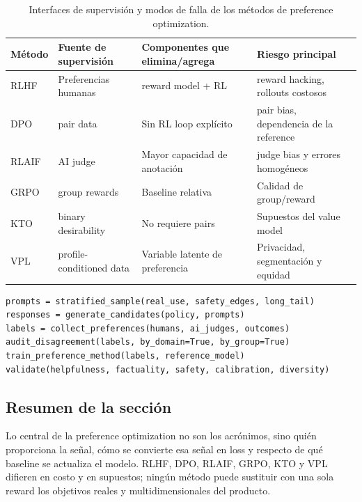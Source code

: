 \documentclass[a4paper]{article}
\begin{document}

\begin{table}[H]
\centering
\small
\begin{tabularx}{\textwidth}{L{0.13\textwidth} L{0.20\textwidth} X X}
\toprule
Método & Fuente de supervisión & Componentes que elimina/agrega & Riesgo principal \\
\midrule
RLHF & Preferencias humanas & reward model + RL & reward hacking, rollouts costosos \\
DPO & pair data & Sin RL loop explícito & pair bias, dependencia de la reference \\
RLAIF & AI judge & Mayor capacidad de anotación & judge bias y errores homogéneos \\
GRPO & group rewards & Baseline relativa & Calidad de group/reward \\
KTO & binary desirability & No requiere pairs & Supuestos del value model \\
VPL & profile-conditioned data & Variable latente de preferencia & Privacidad, segmentación y equidad \\
\bottomrule
\end{tabularx}
\caption{Interfaces de supervisión y modos de falla de los métodos de preference optimization.}
\end{table}

\begin{lstlisting}[caption={Esqueleto mínimo de auditoría de un pipeline de preference data}]
prompts = stratified_sample(real_use, safety_edges, long_tail)
responses = generate_candidates(policy, prompts)
labels = collect_preferences(humans, ai_judges, outcomes)
audit_disagreement(labels, by_domain=True, by_group=True)
train_preference_method(labels, reference_model)
validate(helpfulness, factuality, safety, calibration, diversity)
\end{lstlisting}

\subsection{Resumen de la sección}

Lo central de la preference optimization no son los acrónimos, sino quién proporciona la señal, cómo se convierte esa señal en loss y respecto de qué baseline se actualiza el modelo. RLHF, DPO, RLAIF, GRPO, KTO y VPL difieren en costo y en supuestos; ningún método puede sustituir con una sola reward los objetivos reales y multidimensionales del producto.
\end{document}
